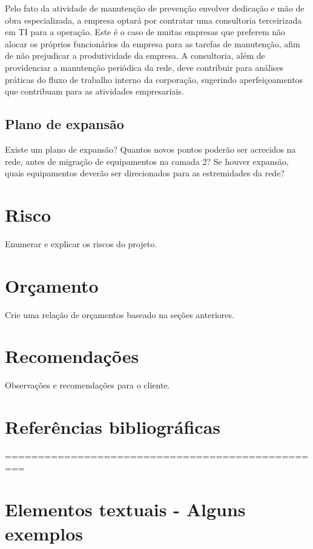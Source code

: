 \documentclass[	DIV=calc,%
							paper=a4,%
							fontsize=12pt,%
							onecolumn]{scrartcl}	 					%
\begin{document}
Pelo fato da atividade de manutenção de prevenção envolver dedicação e mão de obra especializada, a empresa optará por contratar uma consultoria terceirizada em TI para a operação. Este é o caso de muitas empresas que preferem não alocar os próprios funcionários da empresa para as tarefas de manutenção, afim de não prejudicar a produtividade da empresa. A consultoria, além de providenciar a manutenção periódica da rede, deve contribuir para análises práticas do fluxo de trabalho interno da corporação, sugerindo aperfeiçoamentos que contribuam para as atividades empresariais.

\subsection{Plano de expansão}
Existe um plano de expansão? Quantos novos pontos poderão ser acrecidos na rede, antes de migração de equipamentos na camada 2? Se houver expansão, quais equipamentos deverão ser direcionados para as estremidades da rede? 

\section{Risco}
Enumerar e explicar os riscos do projeto.

\section{Orçamento}
Crie uma relação de orçamentos baseado na seções anteriores.

\section{Recomendações}
Observações e recomendações para o cliente.

\section{Referências bibliográficas}

\renewcommand\refname{} %

  

=================================================
\section{Elementos textuais - Alguns exemplos}
\end{document}
